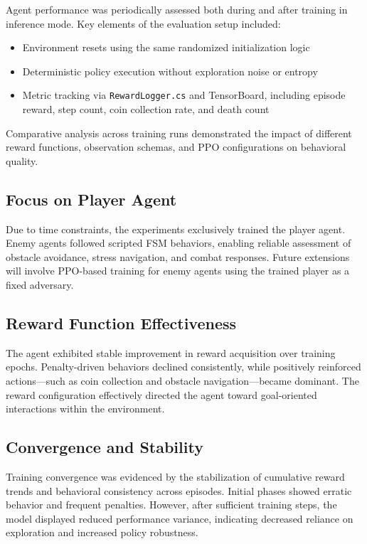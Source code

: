 \documentclass[12pt,oneside,openright,a4paper]{cpe-english-project}
\begin{document}
Agent performance was periodically assessed both during and after training in inference mode. Key elements of the evaluation setup included:

\begin{itemize}
\item Environment resets using the same randomized initialization logic
\item Deterministic policy execution without exploration noise or entropy
\item Metric tracking via \texttt{RewardLogger.cs} and TensorBoard, including episode reward, step count, coin collection rate, and death count
\end{itemize}

Comparative analysis across training runs demonstrated the impact of different reward functions, observation schemas, and PPO configurations on behavioral quality.

\subsection{Focus on Player Agent}

Due to time constraints, the experiments exclusively trained the player agent. Enemy agents followed scripted FSM behaviors, enabling reliable assessment of obstacle avoidance, stress navigation, and combat responses. Future extensions will involve PPO-based training for enemy agents using the trained player as a fixed adversary.

\subsection{Reward Function Effectiveness}

The agent exhibited stable improvement in reward acquisition over training epochs. Penalty-driven behaviors declined consistently, while positively reinforced actions—such as coin collection and obstacle navigation—became dominant. The reward configuration effectively directed the agent toward goal-oriented interactions within the environment.

\subsection{Convergence and Stability}

Training convergence was evidenced by the stabilization of cumulative reward trends and behavioral consistency across episodes. Initial phases showed erratic behavior and frequent penalties. However, after sufficient training steps, the model displayed reduced performance variance, indicating decreased reliance on exploration and increased policy robustness.
\end{document}
